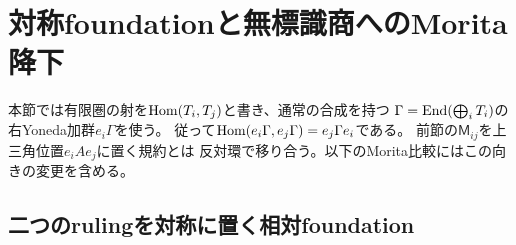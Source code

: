 \section{対称foundationと無標識商へのMorita降下}
\label{sec:qa-symmetric-morita-descent}
本節では有限圏の射を$\operatorname{Hom}(T_i,T_j)$と書き、通常の合成を持つ
$\Gamma=\operatorname{End}(\bigoplus_iT_i)$の右Yoneda加群$e_i\Gamma$を使う。
従って$\operatorname{Hom}(e_i\Gamma,e_j\Gamma)=e_j\Gamma e_i$である。
前節の$\mathsf M_{ij}$を上三角位置$e_iAe_j$に置く規約とは
反対環で移り合う。以下のMorita比較にはこの向きの変更を含める。

\subsection{二つのrulingを対称に置く相対foundation}

